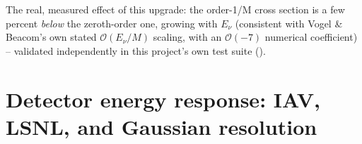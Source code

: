 \begin{notebox}
The real, measured effect of this upgrade: the order-1/M cross section is a
few percent \emph{below} the zeroth-order one, growing with $E_\nu$
(consistent with Vogel \& Beacom's own stated $\mathcal O(E_\nu/M)$
scaling, with an $\mathcal O(-7)$ numerical coefficient) -- validated
independently in this project's own test suite
().
\end{notebox}

\section{Detector energy response: IAV, LSNL, and Gaussian resolution}
\label{sec:iav-lsnl-theory}


